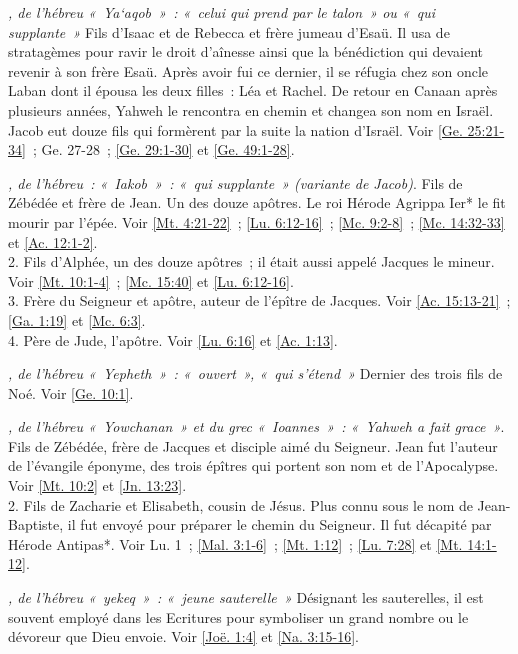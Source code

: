 \begin{multicols}{2}
\textit{, de l'hébreu «~Ya`aqob~»~: «~celui qui prend par le talon~» ou «~qui supplante~»}\newline
Fils d'Isaac et de Rebecca et frère jumeau d'Esaü. Il usa de stratagèmes pour ravir le droit d'aînesse ainsi que la bénédiction qui devaient revenir à son frère Esaü. Après avoir fui ce dernier, il se réfugia chez son oncle Laban dont il épousa les deux filles~: Léa et Rachel. De retour en Canaan après plusieurs années, Yahweh le rencontra en chemin et changea son nom en Israël. Jacob eut douze fils qui formèrent par la suite la nation d'Israël. Voir \vref{Ge. 25:21-34}~; Ge. 27-28~; \vref{Ge. 29:1-30} et \vref{Ge. 49:1-28}.

\textit{, de l'hébreu~: «~Iakob~»~: «~qui supplante~» (variante de Jacob)}. Fils de Zébédée et frère de Jean. Un des douze apôtres. Le roi Hérode Agrippa Ier* le fit mourir par l'épée. Voir \vref{Mt. 4:21-22}~; \vref{Lu. 6:12-16}~; \vref{Mc. 9:2-8}~; \vref{Mc. 14:32-33} et \vref{Ac. 12:1-2}.
\\2. Fils d'Alphée, un des douze apôtres~; il était aussi appelé Jacques le mineur. Voir \vref{Mt. 10:1-4}~; \vref{Mc. 15:40} et \vref{Lu. 6:12-16}.
\\3. Frère du Seigneur et apôtre, auteur de l'épître de Jacques. Voir \vref{Ac. 15:13-21}~; \vref{Ga. 1:19} et \vref{Mc. 6:3}.
\\4. Père de Jude, l'apôtre. Voir \vref{Lu. 6:16} et \vref{Ac. 1:13}.

\textit{, de l'hébreu «~Yepheth~»~: «~ouvert~», «~qui s'étend~»}\newline
Dernier des trois fils de Noé. Voir \vref{Ge. 10:1}.

\textit{, de l'hébreu «~Yowchanan~» et du grec «~Ioannes~»~: «~Yahweh a fait grace~»}. Fils de Zébédée, frère de Jacques et disciple aimé du Seigneur. Jean fut l'auteur de l'évangile éponyme, des trois épîtres qui portent son nom et de l'Apocalypse. Voir \vref{Mt. 10:2} et \vref{Jn. 13:23}.
\\2. Fils de Zacharie et Elisabeth, cousin de Jésus. Plus connu sous le nom de Jean-Baptiste, il fut envoyé pour préparer le chemin du Seigneur. Il fut décapité par Hérode Antipas*. Voir Lu. 1~; \vref{Mal. 3:1-6}~; \vref{Mt. 1:12}~; \vref{Lu. 7:28} et \vref{Mt. 14:1-12}.

\textit{, de l'hébreu «~yekeq~»~: «~jeune sauterelle~»}\newline
Désignant les sauterelles, il est souvent employé dans les Ecritures pour symboliser un grand nombre ou le dévoreur que Dieu envoie. Voir \vref{Joë. 1:4} et \vref{Na. 3:15-16}.


\end{multicols}
